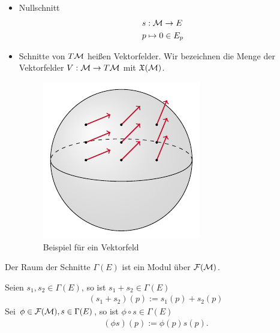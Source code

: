 \begin{bsp}[Schnitte] \leavevmode
\begin{itemize}
\item Nullschnitt
\begin{align}
&s : \mathcal{M} \to E \\
&p \mapsto 0 \in E_p
\end{align}
\item Schnitte von $T\mathcal{M}$ heißen Vektorfelder.
Wir bezeichnen die Menge der Vektorfelder $V: \mathcal{M} \to T\mathcal{M}$ mit $\mathfrak{X}(\mathcal{M})$.
\begin{figure}[h]
\centering
\includegraphics[width=0.4\linewidth]{figures/tikz/vectorfield_on_manifold.pdf}
\caption{Beispiel für ein Vektorfeld}
\label{img:bspvektorfeld}
\end{figure} 
\end{itemize}
\end{bsp}
\begin{satz}
\label{satz:SchnitteModul}
Der Raum der Schnitte $\Gamma (E)$ ist ein Modul über $\mathcal{F}(\mathcal{M})$.
\end{satz}
\begin{bew}
Seien $s_1, s_2 \in \Gamma (E)$, so ist $s_1 + s_2 \in \Gamma (E)$
\begin{align}
(s_1 + s_2)(p) := s_1 (p) + s_2 (p)
\end{align}
Sei $\phi \in \mathcal{F}(\mathcal{M}), s\in \Gamma(E)$, so ist $\phi \circ s \in \Gamma (E)$
\begin{align}
(\phi  s) (p) := \phi (p) s(p).
\end{align}
\end{bew}

